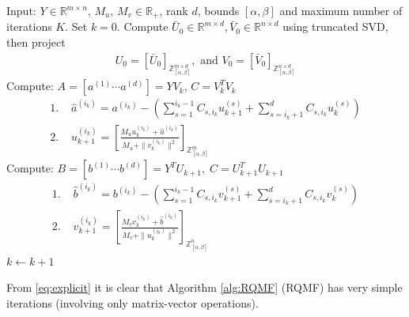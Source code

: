 \documentclass[lettersize,journal]{IEEEtran}
\begin{document}
\begin{algorithm}
\caption{(RQMF)} 
\label{alg:RQMF}
\begin{algorithmic} 
          \STATE Input: $Y \in \mathbb{R}^{m \times n}$, $M_u,\, M_v \in \mathbb{R}_+$, rank $d$, bounds $[\alpha, \beta]$ and maximum number  of  iterations $K$.
			 \STATE Set $k=0$. Compute ${\bar{U}}_{0} \in  \mathbb{R}^{m \times d}, \bar{V}_{0} \in \mathbb{R}^{n \times d}$ using truncated SVD, then project
             \begin{align*}
                 U_0 = [\bar{U}_0]_{\mathbb{Z}^{m\times d}_{[\alpha, \beta]}}, \text{ and }   V_0 = [\bar{V}_0]_{\mathbb{Z}^{n\times d}_{[\alpha, \beta]}}
             \end{align*}
            \STATE Compute: $A = [a^{(1)} \cdots a^{(d)}]= Y V_k$, \;  $C = V_k^TV_k$
            \vspace{-0.6cm}
			     \STATE\begin{align*}
			   \text{1. } &\hat{a}^{(i_k)} =   a^{(i_k)} - \left( \sum_{s=1}^{i_k-1} C_{s, i_k} u_{k+1}^{(s)} + \sum_{s=i_k+1}^{d}  C_{s,i_k} u_{k}^{(s)} \right)\\
                  \text{2. } &u^{(i_k)}_{k+1} = \left[  \frac{M_u u_{k}^{(i_k)} + \hat a^{(i_k)}}{M_u + \| v_{k}^{(i_k)}\|^2}  \right]_{\mathbb{Z}^{m}_{[\alpha, \beta]}}
			\end{align*}
            \ENDFOR  
            \STATE Compute: $B \!=\! [b^{(1)} \cdots b^{(d)}] \!=\! Y^T U_{k+1}, \;  C = U_{k+1}^TU_{k+1}$
            \vspace{-0.6cm}
			\STATE \begin{align*}
			    \text{1. } &\hat{b}^{(i_k)} =  b^{(i_k)} - \left( \sum_{s=1}^{i_k-1} C_{s, i_k} v_{k+1}^{(s)} + \sum_{s=i_k+1}^{d}  C_{s,i_k} v_{k}^{(s)} \right)\\
                  \text{2. } &v^{(i_k)}_{k+1} = \left[  \frac{M_v v_{k}^{(i_k)} + \hat b^{(i_k)}}{M_v + \| u_{k}^{(i_k)}\|^2}  \right]_{\mathbb{Z}^{n}_{[\alpha, \beta]}}
			\end{align*}
                  \ENDFOR  
			 \STATE $k \leftarrow k+1$
			\ENDWHILE
		\end{algorithmic} 
	\end{algorithm}

\noindent From \eqref{eq:explicit} it is clear that Algorithm \ref{alg:RQMF} (RQMF) has very simple  iterations (involving only matrix-vector operations). 
\end{document}
